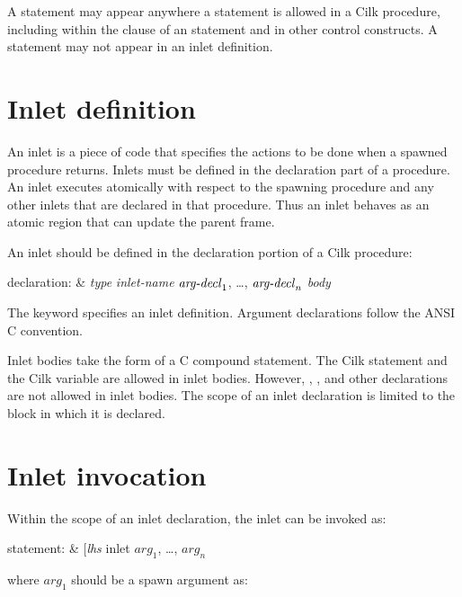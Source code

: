 A  statement may appear anywhere a statement is allowed
in a Cilk procedure, including within the clause of an 
statement and in other control constructs.  A  statement
may not appear in an inlet definition.

\section{Inlet definition}
\label{lanref:inlet-sec}

An inlet is a piece of code that specifies the actions to be done when
a spawned procedure returns.  Inlets must be defined in the
declaration part of a procedure.  An inlet executes atomically with
respect to the spawning procedure and any other inlets that are
declared in that procedure.  Thus an inlet behaves as an atomic region
that can update the parent frame.

An inlet should be defined in the declaration portion of a Cilk procedure:
\begin{syntax}
declaration{\rm :} &  \textit{type} \textit{inlet-name} \cilkkw{(}
       $\mbox{\textit{arg-decl}}_1$,
             \dots, $\mbox{\textit{arg-decl}}_n$\cilkkw{)} \textit{body} 
\end{syntax}
The keyword  specifies an inlet definition.
Argument declarations follow the ANSI C convention.

Inlet bodies take the form of a C compound statement.
The Cilk statement  and the Cilk variable
 are allowed
in inlet bodies. However, , , and other
 declarations are not allowed in inlet bodies.
The scope of an inlet declaration is limited to the block in which it
is declared.

\section{Inlet invocation}
\label{lanref:inletcall-sec}

Within the scope of an inlet declaration, the inlet can be invoked as:

\begin{syntax}
statement{\rm :} & {\rm [}\textit{lhs} \cilkkw{=}{\rm ]} inlet
              \cilkkw{(}$\textit{arg}_1$, \dots, $\textit{arg}_n$\cilkkw{)}\cilkkw{;}
\end{syntax}
where $\textit{arg}_1$ should be a spawn argument as:

